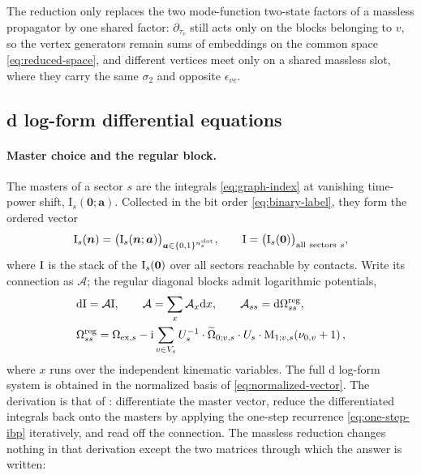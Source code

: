 \documentclass[11pt,a4paper]{article}
\numberwithin{table}{section}
\newcommand{\nn}{\nonumber}
\newcommand{\nd}{\mathrm{d}}
\newcommand{\ii}{\mathrm i}
\begin{document}
The reduction only replaces the two mode-function two-state factors of a massless propagator by
one shared factor: $\partial_{\tau_v}$ still acts only on the blocks belonging to $v$, so the
vertex generators remain sums of embeddings on the common space \eqref{eq:reduced-space}, and
different vertices meet only on a shared massless slot, where they carry the same $\sigma_2$
and opposite $\epsilon_{ve}$.

\subsection{d log-form differential equations}
\label{sec:dlog}

\paragraph{Master choice and the regular block.}
The masters of a sector $s$ are the integrals \eqref{eq:graph-index} at vanishing time-power shift,
$\text{I}_s(\bm 0;\bm a)$. Collected in the bit order \eqref{eq:binary-label}, they form the ordered
vector
\begin{equation}
  \bm{\text I}_s(\bm n)=\big(\text{I}_s(\bm n;\bm a)\big)_{\bm a\in\{0,1\}^{n^{\rm slot}_s}},
  \qquad
  \bm{\text I}=\big(\bm{\text I}_s(\bm 0)\big)_{{\rm all\ sectors}\ s},
  \label{eq:master-vector}
\end{equation}
where $\bm{\text I}$ is the stack of the $\bm{\text I}_s(\bm 0)$ over all sectors reachable by
contacts. Write its connection as $\mathcal A$; the regular diagonal blocks admit logarithmic
potentials,
\begin{align}
&\nd \bm{\text I} = \mathcal A\bm{\text I},\qquad
\mathcal A=\sum_x\mathcal A_x\nd x,\qquad
\mathcal A_{ss}=\nd\Omega_{ss}^{\rm reg},\nn\\
&\Omega_{ss}^{\rm reg}
 =  \Omega_{{\rm ex},s} - \ii \sum_{v\in V_s}U_s^{-1}\cdot  \widetilde{\Omega}_{0;v,s} \cdot  U_s \cdot \text{M}_{1;v,s}(\nu_{0,v}+1) \, ,\label{eq:ndlogDE}
\end{align}
where $x$ runs over the independent kinematic variables. The full d log-form system is obtained
in the normalized basis of \eqref{eq:normalized-vector}.
The derivation is that of \cite{Chen:2023iix}: differentiate the master vector, reduce the
differentiated integrals back onto the masters by applying the one-step recurrence
\eqref{eq:one-step-ibp} iteratively, and read off the connection. The massless reduction changes
nothing in that derivation except the two matrices through which the answer is written:
\end{document}
